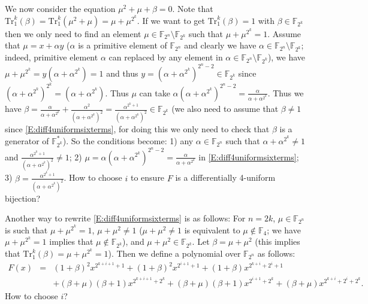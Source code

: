 \documentclass[8pt,oneside]{article}
\newcommand{\0}{\textbf{0}}
\newcommand{\1}{\textbf{1}}
\newcommand{\F}{\mathbb{F}}
\begin{document}
    We now consider the equation $\mu^2+\mu+\beta=0$. Note that
    $\mathrm{Tr}_1^k(\beta)=\mathrm{Tr}_1^k(\mu^2+\mu)=\mu+\mu^{2^k}$.
    If we want to get $\mathrm{Tr}_1^k(\beta)=1$ with $\beta\in\F_{2^k}$ then we
    only need to find an element $\mu\in\F_{2^n}\setminus\F_{2^k}$ such that $\mu+\mu^{2^k}=1$.
    Assume that $\mu=x+\alpha y$ ($\alpha$ is a primitive element of $\F_{2^n}$ and clearly we
    have $\alpha\in\F_{2^n}\setminus\F_{2^k}$; indeed, primitive element $\alpha$ can replaced by any element
    in $\alpha\in\F_{2^n}\setminus\F_{2^k}$),
    we have $\mu+\mu^{2^k}=y(\alpha+\alpha^{2^k})=1$ and thus $y=(\alpha+\alpha^{2^k})^{2^n-2}\in\F_{2^k}$
    since $(\alpha+\alpha^{2^k})^{2^k}=(\alpha+\alpha^{2^k})$. Thus $\mu$ can take $\alpha (\alpha+\alpha^{2^k})^{2^n-2}=\frac{\alpha}{\alpha+\alpha^{2^k}}$.
    Thus we have $\beta=\frac{\alpha}{\alpha+\alpha^{2^k}}+\frac{\alpha^2}{(\alpha+\alpha^{2^k})^2}
    =\frac{\alpha^{2^k+1}}{(\alpha+\alpha^{2^k})^2}\in\F_{2^k}$ (we also need to assume that $\beta\not=1$
    since \eqref{E:diff4uniformsixterms}, for doing this we only need to check that $\beta$ is a generator of $\F_{2^k}^*$).
    So the conditions become: 1) any $\alpha\in\F_{2^n}$ such that $\alpha+\alpha^{2^k}\not=1$ and $\frac{\alpha^{2^k+1}}{(\alpha+\alpha^{2^k})^2}\not=1$;
    2) $\mu=\alpha (\alpha+\alpha^{2^k})^{2^n-2}=\frac{\alpha}{\alpha+\alpha^{2^k}}$ in \eqref{E:diff4uniformsixterms};
    3) $\beta=\frac{\alpha^{2^k+1}}{(\alpha+\alpha^{2^k})^2}$.
    How to choose $i$ to ensure $F$ is a differentially 4-uniform bijection?
    
    
    Another way to rewrite \eqref{E:diff4uniformsixterms} is as follows:
    For $n=2k$, $\mu\in\F_{2^n}$ is such that $\mu+\mu^{2^k}=1$, $\mu+\mu^2\not=1$
    ($\mu+\mu^2\not=1$ is equivalent to $\mu\not\in\F_4$;
    we have $\mu+\mu^{2^k}=1$ implies that $\mu\not\in\F_{2^k}$), and $\mu+\mu^2\in\F_{2^k}$.
    Let $\beta=\mu+\mu^2$ (this implies that $\mathrm{Tr}_1^k(\beta)=\mu+\mu^{2^k}=1$).
    Then we define a polynomial over $\F_{2^n}$ as follows:
    \begin{eqnarray}\label{E:diff4uniformsixtermsmu}
    F(x)&=&(1+\beta)^2 x^{2^{k+i+1}+1}+(1+\beta)^2 x^{2^{i+1}+1}+(1+\beta) x^{2^{k+i}+2^i+1}\\
    &&+(\beta+\mu)(\beta+1) x^{2^{k+i+1}+2^k}+(\beta+\mu)(\beta+1) x^{2^{i+1}+2^k}+(\beta+\mu) x^{2^{k+i}+2^i+2^k}\nonumber.
    \end{eqnarray}
    How to choose $i$?
\end{document}
